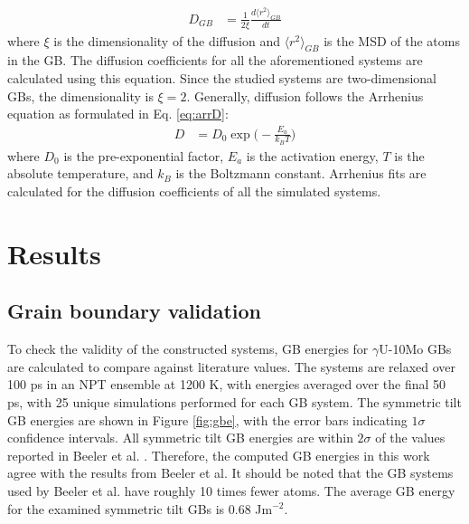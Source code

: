 \documentclass{elsarticle}
\begin{document}
\begin{align}\label{eq:ein}
	D_{GB} &= \frac{1}{2\xi} \frac{d \langle r^2 \rangle_{GB}}{dt}
\end{align}
where $\xi$ is the dimensionality of the diffusion and $\langle r^2 \rangle_{GB}$ is the MSD of the atoms in the GB. The diffusion coefficients for all the aforementioned systems are calculated using this equation. Since the studied systems are two-dimensional GBs, the dimensionality is $\xi=2$. Generally, diffusion follows the Arrhenius equation as formulated in Eq. \ref{eq:arrD}:
\begin{align}
	\label{eq:arrD}
	D &= D_0 \exp \bigg( -\frac{E_a}{k_B T} \bigg)
\end{align}
where $D_0$ is the pre-exponential factor, $E_a$ is the activation energy, $T$ is the absolute temperature, and $k_B$ is the Boltzmann constant. Arrhenius fits are calculated for the diffusion coefficients of all the simulated systems.


\section{Results}

\subsection{Grain boundary validation}

To check the validity of the constructed systems, GB energies for $\gamma$U-10Mo GBs are calculated to compare against literature values. The systems are relaxed over 100 ps in an NPT ensemble at 1200 K, with energies averaged over the final 50 ps, with 25 unique simulations performed for each GB system. The symmetric tilt GB energies are shown in Figure \ref{fig:gbe}, with the error bars indicating $1\sigma$ confidence intervals. All symmetric tilt GB energies are within $2\sigma$ of the values reported in Beeler et al. \cite{beeler2018}. Therefore, the computed GB energies in this work agree with the results from Beeler et al. It should be noted that the GB systems used by Beeler et al. have roughly 10 times fewer atoms. The average GB energy for the examined symmetric tilt GBs is 0.68 Jm$^{-2}$.
\end{document}
